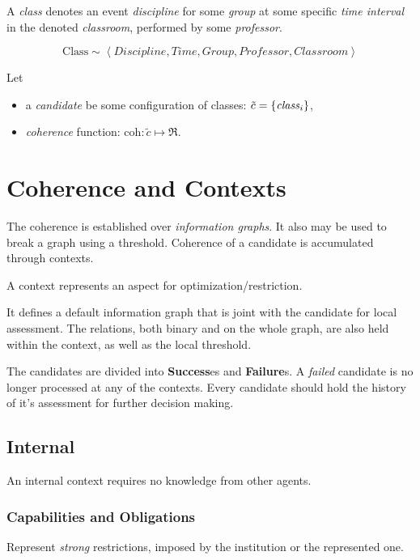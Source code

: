 \documentclass{article}
\begin{document}
\noindent
A \emph{class} denotes an event \emph{discipline} for some \emph{group}
at some specific \emph{time interval} in the denoted \emph{classroom},
performed by some \emph{professor}.

\medskip
$$
 \mathrm{Class} \sim \left< \mathit{Discipline}, \mathit{Time}, \mathit{Group},
  \mathit{Professor}, \mathit{Classroom} \right>
$$
\medskip

\noindent
Let 
\begin{itemize}

\item[] a \emph{candidate} be some configuration of classes:
        $\tilde c = \{\mathit{class}_i\}$,
\item[] \emph{coherence} function: $\mathrm{coh}: \tilde c \mapsto \Re$.
\end{itemize}


\section{Coherence and Contexts}

The coherence is established over \emph{information graphs}. It also may be used
to break a graph using a threshold.
Coherence of a candidate is accumulated through contexts.

A context represents an aspect for optimization/restriction.

It defines a default information graph that is joint with the candidate for
local assessment. The relations, both binary and on the whole graph, are also
held within the context, as well as the local threshold.

The candidates are divided into \textbf{Success}es and \textbf{Failure}s.
A \emph{failed} candidate is no longer processed at any of the contexts.
Every candidate should hold the history of it's assessment for further decision
making.

\subsection{Internal}

An internal context requires no knowledge from other agents.

\subsubsection{Capabilities and Obligations}

Represent \emph{strong} restrictions, imposed by the institution or the
represented one.
\end{document}

